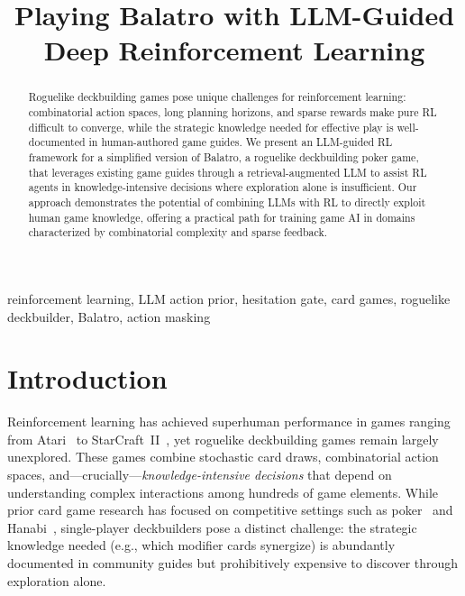 \documentclass[conference]{IEEEtran}
\begin{document}
\title{Playing Balatro with LLM-Guided\\Deep Reinforcement Learning}

\author{
}

\maketitle

\begin{abstract}
Roguelike deckbuilding games pose unique challenges for reinforcement learning: combinatorial action spaces, long planning horizons, and sparse rewards make pure RL difficult to converge, while the strategic knowledge needed for effective play is well-documented in human-authored game guides.
We present an LLM-guided RL framework for a simplified version of Balatro, a roguelike deckbuilding poker game, that leverages existing game guides through a retrieval-augmented LLM to assist RL agents in knowledge-intensive decisions where exploration alone is insufficient.
Our approach demonstrates the potential of combining LLMs with RL to directly exploit human game knowledge, offering a practical path for training game AI in domains characterized by combinatorial complexity and sparse feedback.
\end{abstract}

\begin{IEEEkeywords}
reinforcement learning, LLM action prior, hesitation gate, card games, roguelike deckbuilder, Balatro, action masking
\end{IEEEkeywords}

\section{Introduction}

Reinforcement learning has achieved superhuman performance in games ranging from Atari~\cite{mnih2015human} to StarCraft~II~\cite{vinyals2019grandmaster}, yet roguelike deckbuilding games remain largely unexplored.
These games combine stochastic card draws, combinatorial action spaces, and---crucially---\textit{knowledge-intensive decisions} that depend on understanding complex interactions among hundreds of game elements.
While prior card game research has focused on competitive settings such as poker~\cite{brown2019superhuman} and Hanabi~\cite{bard2020hanabi}, single-player deckbuilders pose a distinct challenge: the strategic knowledge needed (e.g., which modifier cards synergize) is abundantly documented in community guides but prohibitively expensive to discover through exploration alone.
\end{document}
